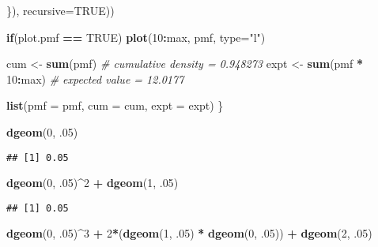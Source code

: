 \documentclass[]{article}
\newenvironment{Shaded}{\begin{snugshade}}{\end{snugshade}}
\newcommand{\KeywordTok}[1]{\textcolor[rgb]{0.13,0.29,0.53}{\textbf{#1}}}
\newcommand{\DataTypeTok}[1]{\textcolor[rgb]{0.13,0.29,0.53}{#1}}
\newcommand{\DecValTok}[1]{\textcolor[rgb]{0.00,0.00,0.81}{#1}}
\newcommand{\StringTok}[1]{\textcolor[rgb]{0.31,0.60,0.02}{#1}}
\newcommand{\CommentTok}[1]{\textcolor[rgb]{0.56,0.35,0.01}{\textit{#1}}}
\newcommand{\OtherTok}[1]{\textcolor[rgb]{0.56,0.35,0.01}{#1}}
\newcommand{\ControlFlowTok}[1]{\textcolor[rgb]{0.13,0.29,0.53}{\textbf{#1}}}
\newcommand{\OperatorTok}[1]{\textcolor[rgb]{0.81,0.36,0.00}{\textbf{#1}}}
\newcommand{\NormalTok}[1]{#1}
\begin{document}
\begin{Shaded}
\begin{Highlighting}[]
\NormalTok{\}), }\DataTypeTok{recursive=}\OtherTok{TRUE}\NormalTok{))}

 \ControlFlowTok{if}\NormalTok{(plot.pmf }\OperatorTok{==}\StringTok{ }\OtherTok{TRUE}\NormalTok{) }\KeywordTok{plot}\NormalTok{(}\DecValTok{10}\OperatorTok{:}\NormalTok{max, pmf, }\DataTypeTok{type=}\StringTok{"l"}\NormalTok{)}

\NormalTok{cum <-}\StringTok{ }\KeywordTok{sum}\NormalTok{(pmf) }\CommentTok{# cumulative density = 0.948273}
\NormalTok{expt <-}\StringTok{ }\KeywordTok{sum}\NormalTok{(pmf }\OperatorTok{*}\StringTok{ }\DecValTok{10}\OperatorTok{:}\NormalTok{max) }\CommentTok{# expected value = 12.0177}

\KeywordTok{list}\NormalTok{(}\DataTypeTok{pmf =}\NormalTok{ pmf, }\DataTypeTok{cum =}\NormalTok{ cum, }\DataTypeTok{expt =}\NormalTok{ expt)}
\NormalTok{\}}

\KeywordTok{dgeom}\NormalTok{(}\DecValTok{0}\NormalTok{, .}\DecValTok{05}\NormalTok{)}
\end{Highlighting}
\end{Shaded}

\begin{verbatim}
## [1] 0.05
\end{verbatim}

\begin{Shaded}
\begin{Highlighting}[]
\KeywordTok{dgeom}\NormalTok{(}\DecValTok{0}\NormalTok{, .}\DecValTok{05}\NormalTok{)}\OperatorTok{^}\DecValTok{2} \OperatorTok{+}\StringTok{ }\KeywordTok{dgeom}\NormalTok{(}\DecValTok{1}\NormalTok{, .}\DecValTok{05}\NormalTok{)}
\end{Highlighting}
\end{Shaded}

\begin{verbatim}
## [1] 0.05
\end{verbatim}

\begin{Shaded}
\begin{Highlighting}[]
\KeywordTok{dgeom}\NormalTok{(}\DecValTok{0}\NormalTok{, .}\DecValTok{05}\NormalTok{)}\OperatorTok{^}\DecValTok{3} \OperatorTok{+}\StringTok{ }\DecValTok{2}\OperatorTok{*}\NormalTok{(}\KeywordTok{dgeom}\NormalTok{(}\DecValTok{1}\NormalTok{, .}\DecValTok{05}\NormalTok{) }\OperatorTok{*}\StringTok{ }\KeywordTok{dgeom}\NormalTok{(}\DecValTok{0}\NormalTok{, .}\DecValTok{05}\NormalTok{)) }\OperatorTok{+}\StringTok{ }\KeywordTok{dgeom}\NormalTok{(}\DecValTok{2}\NormalTok{, .}\DecValTok{05}\NormalTok{)}
\end{Highlighting}
\end{Shaded}
\end{document}
